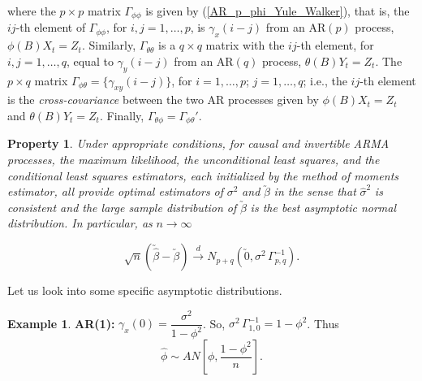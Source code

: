 \documentclass[11pt, a4paper]{article}
\numberwithin{equation}{section}
\theoremstyle{definition}
\newtheorem{property}{Property}[section]
\newtheorem{example}{Example}[subsection]
\begin{document}
where the $p \times p$ matrix $\Gamma_{\phi\phi}$ is given by (\ref{AR_p_phi_Yule_Walker}), that is, the $ij$-th element of 
$\Gamma_{\phi\phi}$, for $i,j=1,\ldots,p$, is $\gamma_x(i-j)$ from an AR$(p)$ process, $\phi(B)X_t = Z_t$. Similarly, $\Gamma_{\theta\theta}$ is a $q\times q$ matrix with the $ij$-th element, for $i,j=1,\ldots,q$, equal to $\gamma_y(i-j)$ from an AR$(q)$ process, $\theta(B)Y_t = Z_t$. The $p \times q$ matrix $\Gamma_{\phi\theta} = \{\gamma_{xy}(i-j)\}$, 
for $i=1,\ldots,p$; $j=1,\ldots,q$; i.e., the $ij$-th element is the \textit{cross-covariance} between the two AR processes given by $\phi(B) X_t = Z_t$ and $\theta(B)Y_t = Z_t$. Finally, $\Gamma_{\theta\phi} = \Gamma_{\phi\theta}'$. \\[0.2em]

\begin{property}\label{large_sample_distribution_of_the_estimators}
\textit{Under appropriate conditions, for causal and invertible ARMA processes, the maximum likelihood, the unconditional least squares, and the conditional least squares estimators, each initialized by the method of moments estimator, all provide optimal estimators of} $\sigma^2$ \textit{and} $\utilde{\beta}$ \textit{in the sense that} $\hat{\sigma}^2$ \textit{is consistent and the large sample distribution of} $\utilde{\beta}$ \textit{is the best asymptotic normal distribution. In particular, as} $n \rightarrow \infty$

\begin{equation}
\sqrt{n} \left( \utilde{\hat{\beta}} - \utilde{\beta} \right) \overset{d}{\rightarrow} N_{p+q} \left( \utilde{0}, \sigma^2 \, \Gamma_{p, q}^{-1} \right).
\end{equation}
\end{property}

Let us look into some specific asymptotic distributions.

\begin{example}
\textbf{AR(1):} $\gamma_x(0) = \dfrac{\sigma^2}{1 - \phi^2}$. So, $\sigma^2 \, \Gamma_{1, 0}^{-1} = 1 - \phi^2$. Thus
$$\hat{\phi} \sim AN\left[ \phi, \dfrac{1-\phi^2}{n} \right].$$
\end{example}
\end{document}
